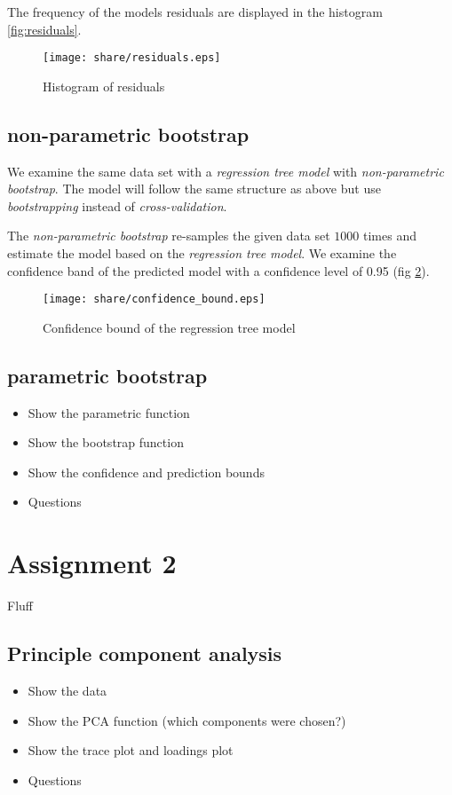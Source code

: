 \documentclass[a4paper, twocolumn]{article}
\begin{document}
        The frequency of the models residuals are displayed in the histogram \ref{fig:residuals}.

        \begin{figure}[h!]
          \centering
          \caption{Histogram of residuals}
          \label{fig:state}
          \texttt{[image: share/residuals.eps]}
        \end{figure}


    \subsection{non-parametric bootstrap}
    
    We examine the same data set with a \emph{regression tree model} with \emph{non-parametric bootstrap}. The model will follow the same structure as above but use \emph{bootstrapping} instead of \emph{cross-validation}.
   
    The \emph{non-parametric bootstrap} re-samples the given data set $1000$ times and estimate the model based on the \emph{regression tree model}. We examine the confidence band of the predicted model with a confidence level of 0.95 (fig \ref{fig:confidence_bound}).
        
        \begin{figure}[h!]
          \centering
          \caption{Confidence bound of the regression tree model}
          \label{fig:confidence_bound}
          \texttt{[image: share/confidence\_bound.eps]}
        \end{figure}
            

    \subsection{parametric bootstrap}
    \begin{itemize}
        \item Show the parametric function
        \item Show the bootstrap function
        \item Show the confidence and prediction bounds
        \item Questions
    \end{itemize}
    \section*{Assignment 2}
    Fluff
    \subsection{Principle component analysis}
    \begin{itemize}
        \item Show the data 
        \item Show the PCA function (which components were chosen?)
        \item Show the trace plot and loadings plot
        \item Questions
    \end{itemize}
\end{document}
